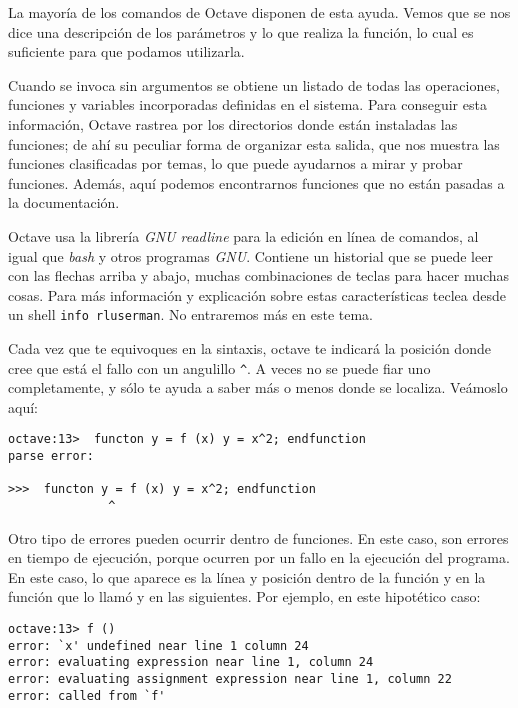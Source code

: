 La mayoría de los comandos de Octave disponen de esta ayuda. Vemos que
se nos  dice una  descripción de  los parámetros y  lo que  realiza la
función, lo cual es suficiente para que podamos utilizarla.

Cuando se  invoca sin argumentos  se obtiene  un listado de  todas las
operaciones,  funciones  y  variables  incorporadas  definidas  en  el
sistema.  Para  conseguir esta  información,  Octave  rastrea por  los
directorios donde están  instaladas las funciones; de  ahí su peculiar
forma  de  organizar  esta  salida,  que  nos  muestra  las  funciones
clasificadas  por temas,  lo  que  puede ayudarnos  a  mirar y  probar
funciones. Además,  aquí podemos  encontrarnos funciones que  no están
pasadas a la documentación.

Octave usa la librería {\em GNU  readline} para la edición en línea de
comandos,  al  igual que  {\em  bash}  y  otros programas  {\em  GNU}.
Contiene  un historial  que se  puede leer  con las  flechas arriba  y
abajo, muchas  combinaciones de teclas  para hacer muchas  cosas. Para
más información y explicación sobre estas características teclea desde
un shell {\tt info rluserman}. No entraremos más en este tema.

Cada  vez que  te equivoques  en la  sintaxis, octave  te indicará  la
posición donde  cree que está  el fallo  con un angulillo  \verb|^|. A
veces no se puede fiar uno completamente,  y sólo te ayuda a saber más
o menos donde se localiza. Veámoslo aquí:

\begin{verbatim}
octave:13>  functon y = f (x) y = x^2; endfunction
parse error:

>>>  functon y = f (x) y = x^2; endfunction
              ^
\end{verbatim}

Otro tipo de errores pueden ocurrir dentro de funciones. En este caso,
son errores en tiempo de ejecución,  porque ocurren por un fallo en la
ejecución del  programa. En este  caso, lo que  aparece es la  línea y
posición dentro de  la función y en  la función que lo llamó  y en las
siguientes. Por ejemplo, en este hipotético caso:

\begin{verbatim}
octave:13> f ()
error: `x' undefined near line 1 column 24
error: evaluating expression near line 1, column 24
error: evaluating assignment expression near line 1, column 22
error: called from `f'
\end{verbatim}

